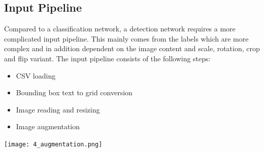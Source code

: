 \documentclass[landscape,a2,final,12pt]{issposter}
\begin{document}
\begin{multicols}{3}
    \begin{samepage}
    \section{Input Pipeline}
        
            \begin{small}Compared to a classification network, a detection network requires a more complicated input pipeline. 
            This mainly comes from the labels which are more complex and in addition dependent on the image content and scale,
             rotation, crop and flip variant. The input pipeline consists of the following steps:
            \begin{itemize}
                \item CSV loading
                \item Bounding box text to grid conversion
                \item Image reading and resizing
                \item Image augmentation
            \end{itemize}
            \begin{minipage}[t]{0.3\textwidth}
                \begin{center}
                    \texttt{[image: 4\_augmentation.png]}
                \end{center}
            \end{minipage}
            \end{small}
    \end{samepage}
    \columnbreak
    \begin{samepage}

\end{samepage}
\end{multicols}
\end{document}
